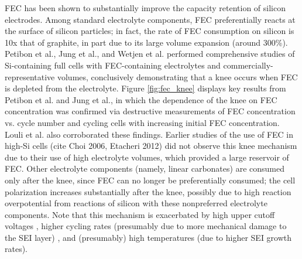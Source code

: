 \documentclass[journal=jpclcd,manuscript=article]{achemso}
\begin{document}
FEC has been shown to substantially improve the capacity retention of silicon electrodes.\cite{choi_effect_2006, etacheri_effect_2012}
Among standard electrolyte components, FEC preferentially reacts at the surface of silicon particles; in fact, the rate of FEC consumption on silicon is 10x that of graphite, in part due to its large volume expansion (around 300\%).\cite{wetjen_differentiating_2017}
Petibon et al.\cite{petibon_studies_2016},
Jung et al.\cite{jung_consumption_2016},
and Wetjen et al.\cite{wetjen_differentiating_2017}
performed comprehensive studies of Si-containing full cells with FEC-containing electrolytes and commercially-representative volumes,
conclusively demonstrating that a knee occurs when FEC is depleted from the electrolyte.
Figure \ref{fig:fec_knee} displays key results from Petibon et al.\cite{petibon_studies_2016} and
Jung et al.\cite{jung_consumption_2016}, in which the dependence of the knee on FEC concentration was confirmed via destructive measurements of FEC concentration vs. cycle number\cite{petibon_studies_2016} and cycling cells with increasing initial FEC concentration\cite{jung_consumption_2016}.
Louli et al.\cite{louli_operando_2019} also corroborated these findings.
Earlier studies of the use of FEC in high-Si cells (cite Choi 2006, Etacheri 2012) did not observe this knee mechanism due to their use of high electrolyte volumes, which provided a large reservoir of FEC.
Other electrolyte components (namely, linear carbonates) are consumed only after the knee, since FEC can no longer be preferentially consumed\cite{petibon_studies_2016}; the cell polarization increases substantially after the knee\cite{petibon_studies_2016, jung_consumption_2016, wetjen_differentiating_2017}, possibly due to high reaction overpotential from reactions of silicon with these nonpreferred electrolyte components.
Note that this mechanism is exacerbated by high upper cutoff voltages \cite{petibon_studies_2016}, higher cycling rates (presumably due to more mechanical damage to the SEI layer) \cite{petibon_studies_2016}, and (presumably) high temperatures (due to higher SEI growth rates).
\end{document}
